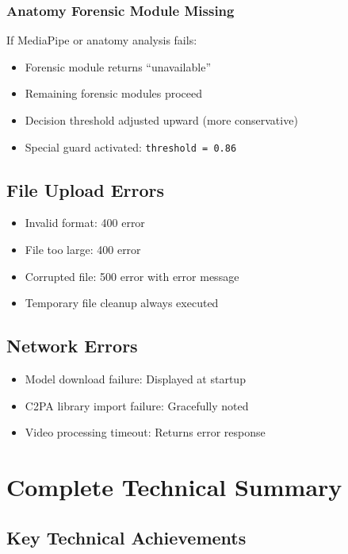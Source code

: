 \documentclass[12pt,a4paper]{book}
\begin{document}
\begin{itemize}
\subsection{Anatomy Forensic Module Missing}
If MediaPipe or anatomy analysis fails:
\begin{itemize}
    \item Forensic module returns ``unavailable''
    \item Remaining forensic modules proceed
    \item Decision threshold adjusted upward (more conservative)
    \item Special guard activated: \texttt{threshold = 0.86}
\end{itemize}

\section{File Upload Errors}

\begin{itemize}
    \item Invalid format: 400 error
    \item File too large: 400 error
    \item Corrupted file: 500 error with error message
    \item Temporary file cleanup always executed
\end{itemize}

\section{Network Errors}

\begin{itemize}
    \item Model download failure: Displayed at startup
    \item C2PA library import failure: Gracefully noted
    \item Video processing timeout: Returns error response
\end{itemize}

\chapter{Complete Technical Summary}
\label{ch:summary}

\section{Key Technical Achievements}


\end{itemize}
\end{document}
